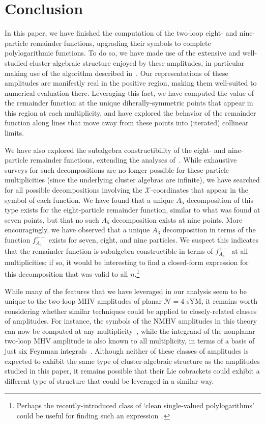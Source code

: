 \documentclass[11pt]{article}
\def\x{\mathcal{X}}
\begin{document}
\section{Conclusion}

In this paper, we have finished the computation of the two-loop eight- and nine-particle remainder functions, upgrading their symbols to complete polylogarithmic functions. To do so, we have made use of the extensive and well-studied cluster-algebraic structure enjoyed by these amplitudes, in particular making use of the algorithm described in~\cite{Golden:2014xqf}. Our representations of these amplitudes are manifestly real in the positive region, making them well-suited to numerical evaluation there. Leveraging this fact, we have computed the value of the remainder function at the unique diherally-symmetric points that appear in this region at each multiplicity, and have explored the behavior of the remainder function along lines that move away from these points into (iterated) collinear limits.

We have also explored the subalgebra constructibility of the eight- and nine-particle remainder functions, extending the analyses of~\cite{Golden:2014xqa,Golden:2018gtk}. While exhaustive surveys for such decompositions are no longer possible for these particle multiplicities (since the underlying cluster algebras are infinite), we have searched for all possible decompositions involving the $\x$-coordinates that appear in the symbol of each function. We have found that a unique $A_5$ decomposition of this type exists for the eight-particle remainder function, similar to what was found at seven points, but that no such $A_5$ decomposition exists at nine points. More encouragingly, we have observed that a unique $A_3$ decomposition in terms of the function $f_{A_3}^{+-}$ exists for seven, eight, and nine particles. We suspect this indicates that the remainder function is subalgebra constructible in terms of $f_{A_3}^{+-}$ at all multiplicities; if so, it would be interesting to find a closed-form expression for this decomposition that was valid to all $n$.\footnote{Perhaps the recently-introduced class of `clean single-valued polylogarithms' could be useful for finding such an expression~\cite{Charlton:2021uhu}.}

While many of the features that we have leveraged in our analysis seem to be unique to the two-loop MHV amplitudes of planar $\mathcal{N}=4$ sYM, it remains worth considering whether similar techniques could be applied to closely-related classes of amplitudes. For instance, the symbols of the NMHV amplitudes in this theory can now be computed at any multiplicity~\cite{Zhang:2019vnm,He:2020vob}, while the integrand of the nonplanar two-loop MHV amplitude is also known to all multiplicity, in terms of a basis of just six Feynman integrals~\cite{Bourjaily:2019iqr,Bourjaily:2019gqu}. Although neither of these classes of amplitudes is expected to exhibit the same type of cluster-algebraic structure as the amplitudes studied in this paper, it remains possible that their Lie cobrackets could exhibit a different type of structure that could be leveraged in a similar way. 
\end{document}
